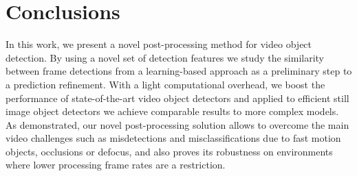 \documentclass[letterpaper, 10 pt, conference]{ieeeconf}
\begin{document}
\section{Conclusions}

In this work, we present a novel post-processing method for video object detection. By using a novel set of detection features we study the similarity between frame detections from a learning-based approach as a preliminary step to a prediction refinement. With a light computational overhead, we boost the performance of state-of-the-art video object detectors and applied to efficient still image object detectors we achieve comparable results to more complex models. As demonstrated, our novel post-processing solution allows to overcome the main video challenges such as misdetections and misclassifications due to fast motion objects, occlusions or defocus, and also proves its robustness on environments where lower processing frame rates are a restriction.






{


}
\end{document}

